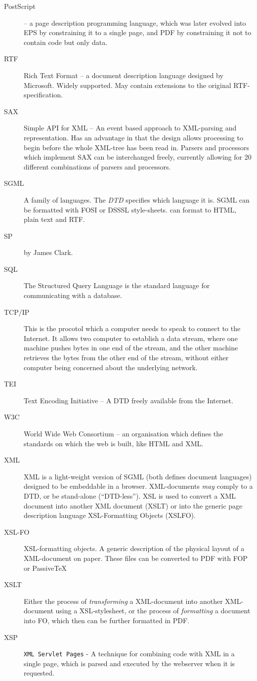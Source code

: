 \begin{description}
\item[PostScript] -- a page description programming language, which was later evolved into EPS by constraining it to a single page, and PDF by constraining it not to contain code but only data.
\item[RTF] Rich Text Format -- a document description language designed by Microsoft.  Widely supported.  May contain extensions to the original RTF-specification.
\item[SAX] Simple API for XML -- An event based approach to XML-parsing and representation.  Has an advantage in that the design allows processing to begin before the whole XML-tree has been read in.  Parsers and processors which implement SAX can be interchanged freely, currently allowing for 20 different combinations of parsers and processors.
\item[SGML] A family of languages.  The \textit{DTD} specifies which language it is.  SGML can be formatted with FOSI or DSSSL style-sheets.   can format to HTML, plain text and RTF.
\item[SP] {} by James Clark.
\item[SQL] The Structured Query Language is the standard language for communicating with a database.
\item[TCP/IP] This is the procotol which a computer needs to speak to connect to the Internet.  It allows two computer to establish a data stream, where one machine pushes bytes in one end of the stream, and the other machine retrieves the bytes from the other end of the stream, without either computer being concerned about the underlying network.
\item[TEI] Text Encoding Initiative -- A DTD freely available from the Internet.
\item[W3C] World Wide Web Consortium -- an organisation which defines
  the standards on which the web is built, like HTML and XML.
\item[XML] XML is a light-weight version of SGML (both defines document languages) designed to be embeddable in a browser.  XML-documents \textit{may} comply to a DTD, or be stand-alone (``DTD-less'').  XSL is used to convert a XML document into another XML document (XSLT) or into the generic page description language XSL-Formatting Objects (XSLFO).
\item[XSL-FO] XSL-formatting objects.  A generic description of the physical layout of a XML-document on paper.  These files can be converted to PDF with FOP or PassiveTeX
\item[XSLT] Either the process of \textit{transforming} a XML-document into another XML-document using a XSL-stylesheet, or the process of \textit{formatting} a document into FO, which then can be further formatted in PDF.
\item[XSP] \texttt{XML Servlet Pages} - A technique for combining code with XML in a single page, which is parsed and executed by the webserver when it is requested.


\end{description}





